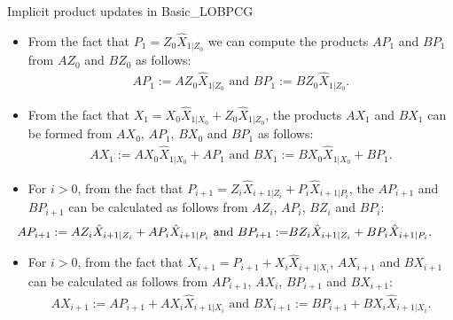 \documentclass[t,usepdftitle=false]{beamer}
\begin{document}
\begin{frame}{Implicit product updates in Basic\_LOBPCG}
	\begin{itemize}
	\item From the fact that $P_1=Z_0\hat{X}_{1|Z_0}$ we can compute the products $AP_1$ and $BP_1$ from $AZ_0$ and $BZ_0$ as follows:
	\begin{align*}
	AP_1:=AZ_0\hat{X}_{1|Z_0}
	\text{ and }
	BP_1:=BZ_0\hat{X}_{1|Z_0}.
	\end{align*}
	\item From the fact that $X_1=X_0\hat{X}_{1|X_0}+Z_0\hat{X}_{1|Z_0}$, the products $AX_1$ and $BX_1$ can be formed from $AX_0$, $AP_1$, $BX_0$ and $BP_1$ as follows:
	\begin{align*}
	AX_1:=AX_0\hat{X}_{1|X_0}+AP_1
	\text{ and }
	BX_1:=BX_0\hat{X}_{1|X_0}+BP_1.
	\end{align*}
	\item For $i>0$, from the fact that $P_{i+1}=Z_{i}\hat{X}_{i+1|Z_i}+P_i\hat{X}_{i+1|P_i}$, the $AP_{i+1}$ and $BP_{i+1}$ can be calculated as follows from $AZ_i$, $AP_i$, $BZ_i$ and $BP_i$:
	\begin{align*}
	\hspace{-.575cm}
	AP_{i+1}:=AZ_i\hat{X}_{i+1|Z_i}+AP_i\hat{X}_{i+1|P_i}
	\text{ and }
	BP_{i+1}:=&BZ_i\hat{X}_{i+1|Z_i}+BP_i\hat{X}_{i+1|P_i}.
	\end{align*}
	\item For $i>0$, from the fact that $X_{i+1}=P_{i+1}+X_{i}\hat{X}_{i+1|X_i}$, $AX_{i+1}$ and $BX_{i+1}$ can be calculated as follows from $AP_{i+1}$, $AX_i$, $BP_{i+1}$ and $BX_{i+1}$:
	\begin{align*}
		AX_{i+1}:=AP_{i+1}+AX_i\hat{X}_{i+1|X_i}
		\text{ and }
		BX_{i+1}:=BP_{i+1}+BX_i\hat{X}_{i+1|X_i}.
	\end{align*}
	\end{itemize}
\end{frame}
\end{document}
